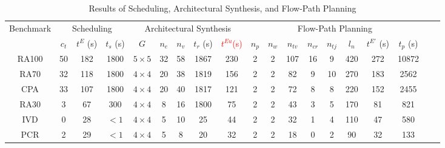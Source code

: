 

\begin{table*}[ht]\normalsize
  \centering
  \begin{threeparttable}[t]
    \caption{Results of Scheduling, Architectural Synthesis, and Flow-Path Planning}
      \begin{tabular}{|c||c|c|c||c|c|c|c|c||c|c|c|c|c|c|c|c|c|c|}\hline
        \multirow{2}[0]{*}{Benchmark} &  \multicolumn{3}{c||}{Scheduling} & \multicolumn{5}{c||}{Architectural Synthesis} & \multicolumn{8}{c|}{Flow-Path Planning} \\\cline{2-17}
            & $c_t$    & $t^E$ (s)    & $t_s$ (s) & $G$     & $n_e$  & $n_v$    & $t_r$ (s) & \textcolor{red}{$t^{Eu}$(s)} &$n_p$ &$n_w$ & $n_{tv}$   &$n_{cr}$ &$n_{tj}$  & $l_n$ & $t^{E'}$ (s) & $t_p$ (s) \\\hline\hline
      RA100 & 50    & 182  & 1800  & $5\times5$   & 32    & 58    & 1867    &230	&2	&2	&107	&16	&9		&420 &272	&10872

      \\\hline
      RA70  & 32    & 118  & 1800  & $4\times4$   & 20    & 38    & 1819 &156	&2 &2	&82	&9	&10		&270 	&183	&2562
      \\\hline
      CPA   & 33    & 107  & 1800  & $4\times4$   & 20    & 40    & 1817  &121	&2	&2	&72	&8	&8	&220	&152	&2455
      \\\hline
      RA30  & 3     & 67   & 300   & $4\times4$   & 8     & 16    & 1800 &75	&2	&2	&43	&3	&5		&170	&81	&821
      \\\hline
      IVD   & 0     & 28   & $<1$    & $4\times4$   & 5     & 10    & 25      &44	&2	&2	&32	&1	&4		&110	&47	&580
      \\\hline
      PCR   & 2     & 29   & $<1$    & $4\times4$   & 5     & 8     & 20     &32 &2	&2	&18	&0	&2		&90	&32	&133
      \\\hline
      \end{tabular}%


\end{threeparttable}
\end{table*}
